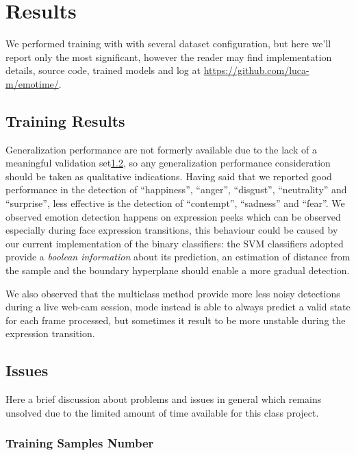 \section{Results}

We performed training with with several dataset configuration, but here we'll report only the most significant, however the reader may find implementation details, source code, trained models and log at \url{https://github.com/luca-m/emotime/}.

\subsection{Training Results}

Generalization performance are not formerly available due to the lack of a meaningful validation set\ref{res:issues}, so any generalization performance consideration should be taken as qualitative indications. Having said that we reported good performance in the detection of ``happiness'', ``anger'', ``disgust'', ``neutrality'' and ``surprise'', less effective is the detection of ``contempt'', ``sadness'' and ``fear''. We observed emotion detection happens on expression peeks which can be observed especially during face expression transitions, this behaviour could be caused by our current implementation of the binary classifiers: the SVM classifiers adopted provide a \emph{boolean information} about its prediction, an estimation of distance from the sample and the boundary hyperplane should enable a more gradual detection. 

We also observed that the  multiclass method provide more less noisy detections during a live web-cam session,  mode instead is able to always predict a valid state for each frame processed, but sometimes it result to be more unstable during the expression transition. 

\subsection{Issues}
\label{res:issues}

Here a brief discussion about problems and issues in general which remains unsolved due to the limited amount of time available for this class project.

\subsubsection*{Training Samples Number}

